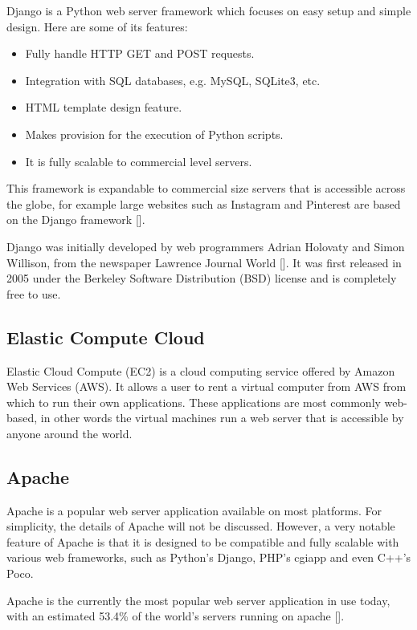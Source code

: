 Django is a Python web server framework which focuses on easy setup and simple design. Here are
some of its features:

\begin{itemize}
  \item Fully handle HTTP GET and POST requests.
  \item Integration with SQL databases, e.g. MySQL, SQLite3, etc.
  \item HTML template design feature.
  \item Makes provision for the execution of Python scripts.
  \item It is fully scalable to commercial level servers.
\end{itemize}

This framework is expandable to commercial size servers that is accessible across the globe,
for example large websites such as Instagram and Pinterest are based on the Django framework
[\cite{website:django-sites}].

Django was initially developed by web programmers Adrian Holovaty and Simon Willison, from the
newspaper Lawrence Journal World [\cite{website:django-exist}]. It was first released in 2005
under the Berkeley Software Distribution (BSD) license and is completely free to use.

\subsection{Elastic Compute Cloud}

Elastic Cloud Compute (EC2) is a cloud computing service offered by Amazon Web Services (AWS).
It allows a user to rent a virtual computer from AWS from which to run their own applications.
These applications are most commonly web-based, in other words the virtual machines run a
web server that is accessible by anyone around the world.  

\subsection{Apache}

Apache is a popular web server application available on most platforms. For simplicity, the
details of Apache will not be discussed. However, a very notable feature of Apache is that it
is designed to be compatible and fully scalable with various web frameworks, such as Python's
Django, PHP's cgiapp and even C++'s Poco.

Apache is the currently the most popular web server application in use today, with an estimated
53.4\% of the world's servers running on apache [\cite{website:apache-usage}].

